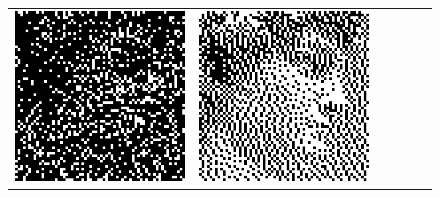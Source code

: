 \begin{figure}
\begin{tabular}{c c c c c c}
		\includegraphics[width=\tilewidth,interpolate=false]{media/chp2/associative_memory/binam/05_01_noise_scaled_crushed.png}&%
		\includegraphics[width=\tilewidth,interpolate=false]{media/chp2/associative_memory/binam/05_02_out_scaled_crushed.png}\\

\end{tabular}
\end{figure}

